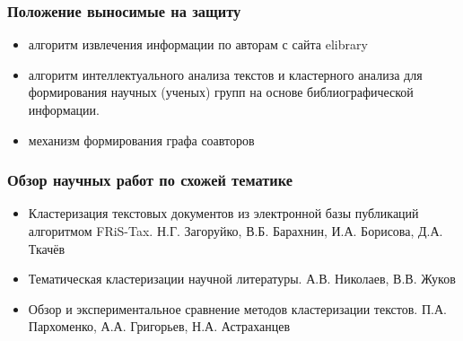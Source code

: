 \documentclass[9pt, compress]{beamer}
\begin{document}
	\begin{frame} 
		\frametitle{Положение выносимые на защиту}
		\begin{itemize}
		    \item алгоритм извлечения информации по авторам с сайта elibrary
			\item алгоритм интеллектуального анализа текстов и кластерного анализа для формирования научных (ученых) групп  на основе библиографической информации.
			\item механизм формирования графа соавторов
		\end{itemize}
	\end{frame}
	
	\begin{frame} 
		\frametitle{Обзор научных работ по схожей тематике}
		\begin{itemize}
		    \item Кластеризация текстовых документов из электронной базы публикаций алгоритмом FRiS-Tax. Н.Г. Загоруйко, В.Б. Барахнин, И.А. Борисова, Д.А. Ткачёв
			\item Тематическая кластеризации научной литературы. А.В. Николаев, В.В. Жуков
			\item Обзор и экспериментальное сравнение методов кластеризации текстов. П.А. Пархоменко, А.А. Григорьев, Н.А. Астраханцев
		\end{itemize}
	\end{frame}
\end{document}
